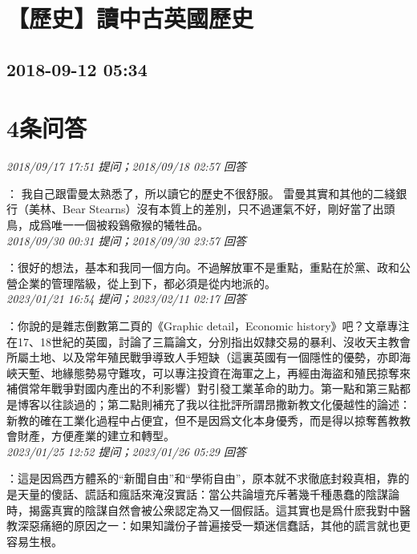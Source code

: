 \documentclass[twocolumn]{ctexart}
\begin{document}
\section{【歷史】讀中古英國歷史}
\subsection{2018-09-12 05:34}


\section{4条问答}

\textit{\hfill\noindent\small 2018/09/17 17:51 提问；2018/09/18 02:57 回答}

：
我自己跟雷曼太熟悉了，所以讀它的歷史不很舒服。
雷曼其實和其他的二綫銀行（美林、Bear Stearns）沒有本質上的差別，只不過運氣不好，剛好當了出頭鳥，成爲唯一一個被殺鷄儆猴的犧牲品。
\\

\textit{\hfill\noindent\small 2018/09/30 00:31 提问；2018/09/30 23:57 回答}

：很好的想法，基本和我同一個方向。不過解放軍不是重點，重點在於黨、政和公營企業的管理階級，從上到下，都必須是從内地派的。
\\

\textit{\hfill\noindent\small 2023/01/21 16:54 提问；2023/02/11 02:17 回答}

：你說的是雜志倒數第二頁的《Graphic detail，Economic history》吧？文章專注在17、18世紀的英國，討論了三篇論文，分別指出奴隸交易的暴利、沒收天主教會所屬土地、以及常年殖民戰爭導致人手短缺（這裏英國有一個隱性的優勢，亦即海峽天塹、地緣態勢易守難攻，可以專注投資在海軍之上，再經由海盜和殖民掠奪來補償常年戰爭對國内產出的不利影響）對引發工業革命的助力。第一點和第三點都是博客以往談過的；第二點則補充了我以往批評所謂昂撒新教文化優越性的論述：新教的確在工業化過程中占便宜，但不是因爲文化本身優秀，而是得以掠奪舊教教會財產，方便產業的建立和轉型。
\\

\textit{\hfill\noindent\small 2023/01/25 12:52 提问；2023/01/26 05:29 回答}

：這是因爲西方體系的“新聞自由”和“學術自由”，原本就不求徹底封殺真相，靠的是天量的傻話、謊話和瘋話來淹沒實話：當公共論壇充斥著幾千種愚蠢的陰謀論時，揭露真實的陰謀自然會被公衆認定為又一個假話。這其實也是爲什麽我對中醫教深惡痛絕的原因之一：如果知識份子普遍接受一類迷信蠢話，其他的謊言就也更容易生根。
\end{document}
